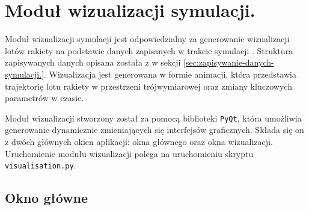 \section{Moduł wizualizacji symulacji.}\label{sec:modul-wizualizacyjny-symulacji.}

Moduł wizualizacji symulacji jest odpowiedzialny za generowanie
wizualizacji lotów rakiety na podstawie danych zapisanych w trakcie symulacji . Struktura zapisywanych danych opisana została z w sekcji
\ref{sec:zapisywanie-danych-symulacji.}. Wizualizacja jest generowana w formie
animacji, która przedstawia trajektorię lotu rakiety w przestrzeni trójwymiarowej oraz zmiany kluczowych parametrów w czasie.

Moduł wizualizacji stworzony został za pomocą
biblioteki \texttt{PyQt}, która umożliwia generowanie dynamicznie zmieniających się interfejsów graficznych. Składa się on z dwóch
głównych okien aplikacji: okna głównego oraz okna wizualizacji.\\
Uruchomienie modułu wizualizacji polega na uruchomieniu skryptu \texttt{
    visualisation.py}.

\subsection{Okno główne}

